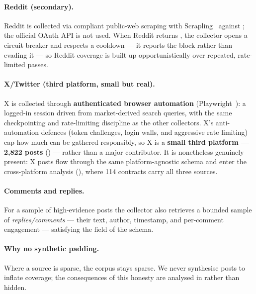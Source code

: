 \paragraph{Reddit (secondary).} Reddit is collected via compliant public-web scraping
with Scrapling~\cite{scrapling} against ; the official OAuth API
is not used. When Reddit returns , the collector opens a circuit
breaker and respects a cooldown --- it reports the block rather than evading it ---
so Reddit coverage is built up opportunistically over repeated, rate-limited passes.

\paragraph{X/Twitter (third platform, small but real).} X is collected through
\textbf{authenticated browser automation} (Playwright~\cite{playwright}): a logged-in
session driven from market-derived search queries, with the same checkpointing and
rate-limiting discipline as the other collectors. X's anti-automation defences (token
challenges, login walls, and aggressive  rate limiting) cap how much can
be gathered responsibly, so X is a \textbf{small third platform --- 2{,}822 posts}
() --- rather than a major contributor. It is nonetheless genuinely
present: X posts flow through the same platform-agnostic schema and enter the
cross-platform analysis (), where 114 contracts carry all three
sources.

\paragraph{Comments and replies.} For a sample of high-evidence posts the collector
also retrieves a bounded sample of \emph{replies/comments} --- their text, author,
timestamp, and per-comment engagement --- satisfying the  field of the
schema.

\paragraph{Why no synthetic padding.} Where a source is sparse, the corpus stays
sparse. We never synthesise posts to inflate coverage; the consequences of this
honesty are analysed in  rather than hidden.

